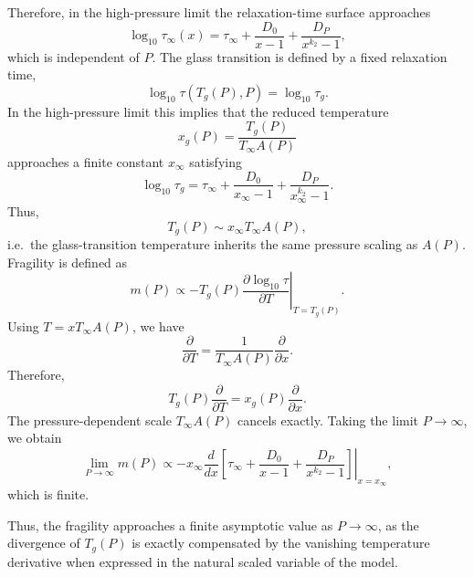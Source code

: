 \noindent Therefore, in the high-pressure limit the relaxation-time surface approaches
\begin{equation}
	\log_{10}\tau_{\infty}(x)
	=
	\tau_{\infty}
	+
	\frac{D_0}{x - 1}
	+
	\frac{D_P}{x^{k_2} - 1},
\end{equation}
which is independent of $P$. The glass transition is defined by a fixed relaxation time,
\begin{equation}
	\log_{10}\tau(T_g(P),P) = \log_{10}\tau_g.
\end{equation}
In the high-pressure limit this implies that the reduced temperature
\begin{equation}
	x_g(P) = \frac{T_g(P)}{T_{\infty}A(P)}
\end{equation}
approaches a finite constant $x_{\infty}$ satisfying
\begin{equation}
	\log_{10}\tau_g
	=
	\tau_{\infty}
	+
	\frac{D_0}{x_{\infty} - 1}
	+
	\frac{D_P}{x_{\infty}^{k_2} - 1}.
\end{equation}
Thus,
\begin{equation}
	T_g(P) \sim x_{\infty} T_{\infty} A(P),
\end{equation}
i.e.\ the glass-transition temperature inherits the same pressure scaling as $A(P)$. Fragility is defined as
\begin{equation}
	m(P) \propto
	- T_g(P)
	\left.
	\frac{\partial \log_{10}\tau}{\partial T}
	\right|_{T=T_g(P)}.
\end{equation}
Using $T = x T_{\infty}A(P)$, we have
\begin{equation}
	\frac{\partial}{\partial T}
	=
	\frac{1}{T_{\infty}A(P)}\frac{\partial}{\partial x}.
\end{equation}
Therefore,
\begin{equation}
	T_g(P)\frac{\partial}{\partial T}
	=
	x_g(P)\frac{\partial}{\partial x}.
\end{equation}
The pressure-dependent scale $T_{\infty}A(P)$ cancels exactly. Taking the limit $P \to \infty$, we obtain
\begin{equation}
	\lim_{P\to\infty} m(P)
	\propto
	- x_{\infty}
	\left.
	\frac{d}{dx}
	\left[
	\tau_{\infty}
	+
	\frac{D_0}{x - 1}
	+
	\frac{D_P}{x^{k_2} - 1}
	\right]
	\right|_{x = x_{\infty}},
\end{equation}
which is finite.

\medskip
\noindent
Thus, the fragility approaches a finite asymptotic value as $P \to \infty$, as the divergence of $T_g(P)$ is exactly compensated by the vanishing temperature derivative when expressed in the natural scaled variable of the model.

